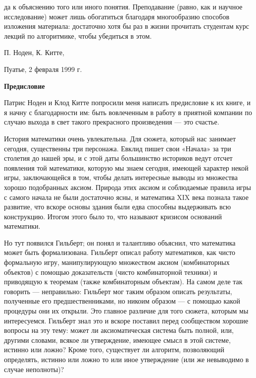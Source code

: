 {{\pagebreak
\noindent
да к объяснению того или иного понятия. Преподавание (равно, как и научное исследование) может лишь обогатиться благодаря многообразию способов изложения материала: достаточно хотя бы раз в жизни прочитать студентам курс лекций по алгоритмике, чтобы убедиться в этом.

\hspace{3.8in} П. Ноден, К. Китте,
        
\hspace{3.3in} Пуатье, 2 февраля 1999 г.
\newpage
\cleartop
\vspace*{30pt}
\begin{center}
\textbf{\Large Предисловие}
\end{center}
   Патрис Ноден и Клод Китте попросили меня написать предисловие к их книге, и я начну с благодарности им: быть вовлеченным в работу в приятной компании по случаю выхода в свет такого прекрасного произведения — это счастье.

   История математики очень увлекательна. Для сюжета, который нас занимает сегодня, существенны три персонажа. Евклид пишет свои «Начала» за три столетия до нашей эры, и с этой даты большинство историков ведут отсчет появления той математики, которую мы знаем сегодня, имеющей характер некой игры, заключающейся в том, чтобы делать интересные выводы из множества хорошо подобранных аксиом. Природа этих аксиом и соблюдаемые правила игры с самого начала не были достаточно ясны, и математика XIX века познала такое развитие, что вскоре основы здания были едва способны выдерживать всю конструкцию. Итогом этого было то, что называют кризисом оснований математики.

   Но тут появился Гильберт; он понял и талантливо объяснил, что математика может быть формализована. Гильберт описал работу математиков, как чисто формальную игру, манипулирующую множеством аксиом (комбинаторных объектов) с помощью доказательств (чисто комбинаторной техники) и приводящую к теоремам (также комбинаторным объектам). На самом деле так говорить — неправильно: Гильберт мог таким образом описать результаты, полученные его предшественниками, но никоим образом — с помощью какой процедуры они их открыли. Это главное различие для того сюжета, которым мы интересуемся. Гильберт знал это и вскоре поставил перед сообществом хорошие вопросы на эту тему: может ли аксиоматическая система быть полной, или, другими словами, всякое ли утверждение, имеющее смысл в этой системе, истинно или ложно? Кроме того, существует ли алгоритм, позволяющий определять, истинно или ложно то или иное утверждение (или же невыводимо в случае неполноты)?

}}
